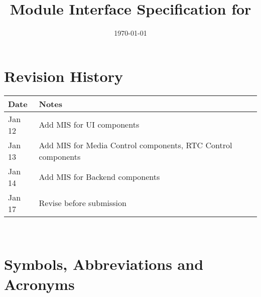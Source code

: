 \documentclass[12pt, titlepage]{article}
\begin{document}
\title{Module Interface Specification for \progname{}}

\author{\authname}

\date{\today}

\maketitle


\section{Revision History}

\begin{tabularx}{\textwidth}{p{3cm}X}
  \toprule
  {\bf Date} & {\bf Notes}                                                  \\
  \midrule
  Jan 12     & Add MIS for UI components                                    \\
  Jan 13     & Add MIS for Media Control components, RTC Control components \\
  Jan 14     & Add MIS for Backend components                               \\
  Jan 17     & Revise before submission                                     \\
  \bottomrule
\end{tabularx}

~\newpage
\section{Symbols, Abbreviations and Acronyms}
\end{document}
